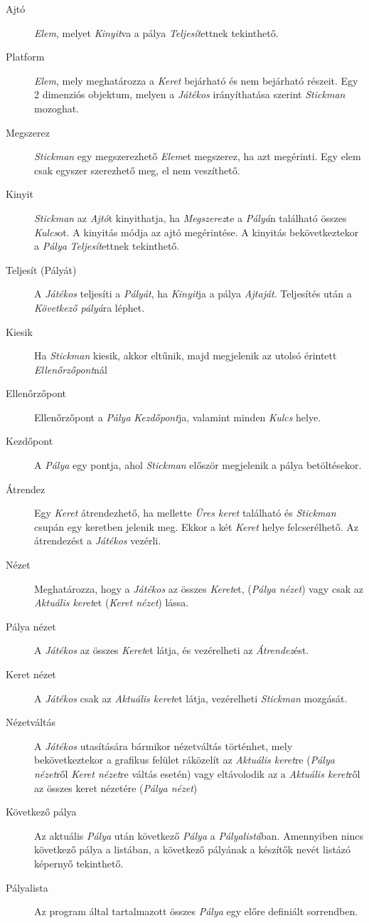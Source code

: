 \begin{description}
    \item[Ajtó] \emph{Elem}, melyet \emph{Kinyit}va a pálya \emph{Teljesít}ettnek tekinthető.
    \item[Platform] \emph{Elem}, mely meghatározza a \emph{Keret} bejárható és nem bejárható részeit. Egy 2 dimenziós objektum, melyen a \emph{Játékos} irányíthatása szerint \emph{Stickman} mozoghat.
    \item[Megszerez] \emph{Stickman} egy megszerezhető \emph{Elem}et megszerez, ha azt megérinti. Egy elem csak egyszer szerezhető meg, el nem veszíthető.
    \item[Kinyit] \emph{Stickman} az \emph{Ajtó}t kinyithatja, ha \emph{Megszerez}te a \emph{Pályá}n található összes \emph{Kulcs}ot. A kinyitás módja az ajtó megérintése. A kinyitás bekövetkeztekor a \emph{Pálya} \emph{Teljesít}ettnek tekinthető.
    \item[Teljesít (Pályát)] A \emph{Játékos} teljesíti a \emph{Pályát}, ha \emph{Kinyit}ja a pálya \emph{Ajtaját}. Teljesítés után a \emph{Következő pályá}ra léphet.
    \item[Kiesik] Ha \emph{Stickman} kiesik, akkor eltűnik, majd megjelenik az utolsó érintett \emph{Ellenőrzőpont}nál
    \item[Ellenőrzőpont] Ellenőrzőpont a \emph{Pálya} \emph{Kezdőpont}ja, valamint minden \emph{Kulcs} helye.
    \item[Kezdőpont] A \emph{Pálya} egy pontja, ahol \emph{Stickman} először megjelenik a pálya betöltésekor.
    \item[Átrendez] Egy \emph{Keret} átrendezhető, ha mellette \emph{Üres keret} található és \emph{Stickman} csupán egy keretben jelenik meg. Ekkor a két \emph{Keret} helye felcserélhető. Az átrendezést a \emph{Játékos} vezérli.
    \item[Nézet] Meghatározza, hogy a \emph{Játékos} az összes \emph{Keret}et, (\emph{Pálya nézet}) vagy csak az \emph{Aktuális keret}et (\emph{Keret nézet}) lássa.
    \item[Pálya nézet] A \emph{Játékos} az összes \emph{Keret}et látja, és vezérelheti az \emph{Átrendez}ést.
    \item[Keret nézet] A \emph{Játékos} csak az \emph{Aktuális keret}et látja, vezérelheti \emph{Stickman} mozgását.
    \item[Nézetváltás] A \emph{Játékos} utasítására bármikor nézetváltás történhet, mely bekövetkeztekor a grafikus felület ráközelít az \emph{Aktuális keret}re (\emph{Pálya nézet}ről \emph{Keret nézet}re váltás esetén) vagy eltávolodik az a \emph{Aktuális keret}ről az összes keret nézetére (\emph{Pálya nézet})
    \item[Következő pálya] Az aktuális \emph{Pálya} után következő \emph{Pálya} a \emph{Pályalistá}ban. Amennyiben nincs következő pálya a listában, a következő pályának a készítők nevét listázó képernyő tekinthető.
    \item[Pályalista] Az program által tartalmazott összes \emph{Pálya} egy előre definiált sorrendben.

\end{description}


